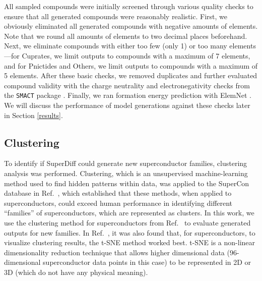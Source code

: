 \documentclass[%
reprint,
 amsmath,amssymb,
 aps,
prb,
]{revtex4-2}
\begin{document}
All sampled compounds were initially screened through various quality checks to ensure that all generated compounds were reasonably realistic. First, we obviously eliminated all generated compounds with negative amounts of elements. Note that we round all amounts of elements to two decimal places beforehand. Next, we eliminate compounds with either too few (only 1) or too many elements---for Cuprates, we limit outputs to compounds with a maximum of 7 elements, and for Pnictides and Others, we limit outputs to compounds with a maximum of 5 elements. After these basic checks, we removed duplicates and further evaluated compound validity with the charge neutrality and electronegativity checks from the \texttt{SMACT} package \cite{DAVIES2016617}. Finally, we ran formation energy prediction with ElemNet \cite{Jha2018, Jha2019}. We will discuss the performance of model generations against these checks later in Section \ref{results}.


\subsection{Clustering}
\label{sec:cluster}

To identify if SuperDiff could generate new superconductor families, clustering analysis was performed. Clustering, which is an unsupervised machine-learning method used to find hidden patterns within data, was applied to the SuperCon database in Ref.~\cite{ROTER20221354078}, which established that these methods, when applied to superconductors, could exceed human performance in identifying different ``families'' of superconductors, which are represented as clusters. In this work, we use the clustering method for superconductors from Ref.~\cite{ROTER20221354078} to evaluate generated outputs for new families. In Ref.~\cite{ROTER20221354078}, it was also found that, for superconductors, to visualize clustering results, the t-SNE method worked best. t-SNE is a non-linear dimensionality reduction technique that allows higher dimensional data ($96$-dimensional superconductor data points in this case) to be represented in 2D or 3D \cite{vanDerMaaten2008} (which do not have any physical meaning).
\end{document}
